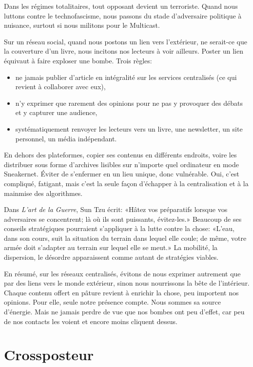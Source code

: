 \documentclass[a5paper, 10pt, twoside]{book}
\let\oldsection\section
\renewcommand{\section}[1]{%
  \oldsection{#1}%
  \par\vspace{\baselineskip}%
}
\providecommand{\tightlist}{%
  \setlength{\itemsep}{0pt}\setlength{\parskip}{0pt}%
}
\begin{document}
Dans les régimes totalitaires, tout opposant devient un terroriste.
Quand nous luttons contre le technofascisme, nous passons du stade
d’adversaire politique à nuisance, surtout si nous militons pour le
Multicast.

Sur un réseau social, quand nous postons un lien vers l’extérieur, ne
serait-ce que la couverture d’un livre, nous incitons nos lecteurs à
voir ailleurs. Poster un lien équivaut à faire exploser une bombe. Trois
règles:

\begin{itemize}
\tightlist
\item
  ne jamais publier d’article en intégralité sur les services
  centralisés (ce qui revient à collaborer avec eux),
\item
  n’y exprimer que rarement des opinions pour ne pas y provoquer des
  débats et y capturer une audience,
\item
  systématiquement renvoyer les lecteurs vers un livre, une newsletter,
  un site personnel, un média indépendant.
\end{itemize}

En dehors des plateformes, copier ses contenus en différents endroits,
voire les distribuer sous forme d’archives lisibles sur n’importe quel
ordinateur en mode Sneakernet. Éviter de s’enfermer en un lieu unique,
donc vulnérable. Oui, c’est compliqué, fatigant, mais c’est la seule
façon d’échapper à la centralisation et à la mainmise des algorithmes.

Dans \emph{L’art de la Guerre}, Sun Tzu écrit: «Hâtez vos préparatifs
lorsque vos adversaires se concentrent; là où ils sont puissants,
évitez-les.» Beaucoup de ses conseils stratégiques pourraient
s’appliquer à la lutte contre la chose: «L’eau, dans son cours, suit la
situation du terrain dans lequel elle coule; de même, votre armée doit
s’adapter au terrain sur lequel elle se meut.» La mobilité, la
dispersion, le désordre apparaissent comme autant de stratégies viables.

En résumé, sur les réseaux centralisés, évitons de nous exprimer
autrement que par des liens vers le monde extérieur, sinon nous
nourrissons la bête de l’intérieur. Chaque contenu offert en pâture
revient à enrichir la chose, peu importent nos opinions. Pour elle,
seule notre présence compte. Nous sommes sa source d’énergie. Mais ne
jamais perdre de vue que nos bombes ont peu d’effet, car peu de nos
contacts les voient et encore moins cliquent dessus.

\section{\texorpdfstring{Crossposteur}{}}\label{crossposteur}
\end{document}
